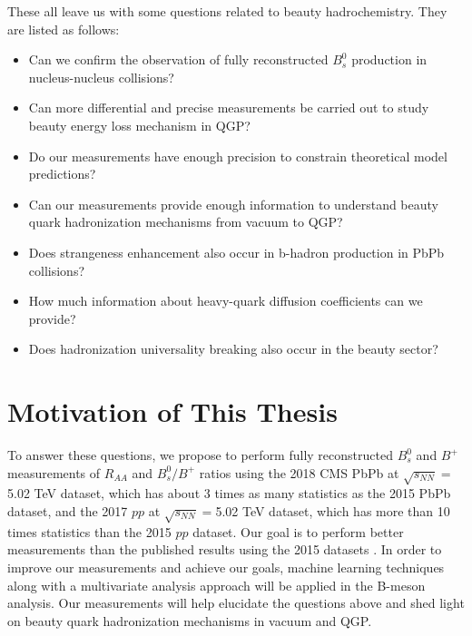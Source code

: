 These all leave us with some questions related to beauty hadrochemistry. They are listed as follows:

\begin{itemize}
\item Can we confirm the observation of fully reconstructed $B^0_s$ production in nucleus-nucleus collisions?
\item Can more differential and precise measurements be carried out to study beauty energy loss mechanism in QGP?
\item Do our measurements have enough precision to constrain theoretical model predictions?
\item Can our measurements provide enough information to understand beauty quark hadronization mechanisms from vacuum to QGP?
\item Does strangeness enhancement also occur in b-hadron production in PbPb collisions?
\item How much information about heavy-quark diffusion coefficients can we provide?
\item Does hadronization universality breaking also occur in the beauty sector?
\end{itemize}







\section{Motivation of This Thesis}

To answer these questions, we propose to perform fully reconstructed $B^0_s$ and $B^+$ measurements of $R_{AA}$ and $B^0_s/B^+$ ratios using the 2018 CMS PbPb at $\sqrt{s_{NN}} = $5.02 TeV dataset, which has about 3 times as many statistics as the 2015 PbPb dataset, and the 2017 $pp$ at $\sqrt{s_{NN}} = $5.02 TeV dataset, which has more than 10 times statistics than the 2015 $pp$ dataset. Our goal is to perform better measurements than the published results using the 2015 datasets \cite{CMSBsBP2015}. In order to improve our measurements and achieve our goals, machine learning techniques along with a multivariate analysis approach will be applied in the B-meson analysis. Our measurements will  help elucidate the questions above and shed light on beauty quark hadronization mechanisms in vacuum and QGP. 



